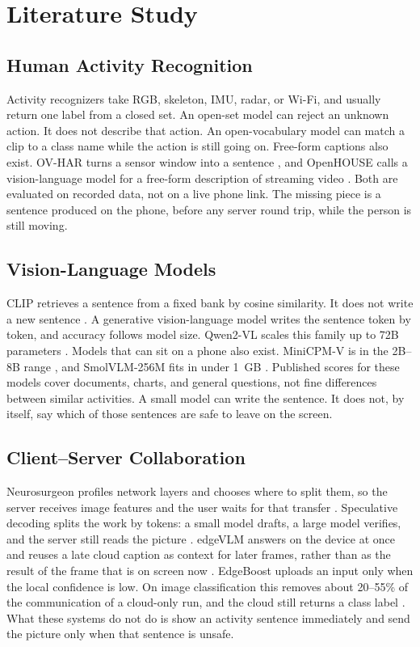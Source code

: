 \section{Literature Study}

\subsection{Human Activity Recognition}
Activity recognizers take RGB, skeleton, IMU, radar, or Wi-Fi, and usually
return one label from a closed set. An open-set model can reject an unknown
action. It does not describe that action. An open-vocabulary model can match
a clip to a class name while the action is still going on. Free-form
captions also exist. OV-HAR turns a sensor window into a sentence
\cite{ray2025ovhar}, and OpenHOUSE calls a vision-language model for a
free-form description of streaming video \cite{kang2025openhouse}. Both are
evaluated on recorded data, not on a live phone link. The missing piece is a
sentence produced on the phone, before any server round trip, while the
person is still moving.
\subsection{Vision-Language Models}
CLIP retrieves a sentence from a fixed bank by cosine similarity. It does
not write a new sentence \cite{radford2021learning}. A generative
vision-language model writes the sentence token by token, and accuracy
follows model size. Qwen2-VL scales this family up to 72B parameters
\cite{wang2024qwen2vl}. Models that can sit on a phone also exist.
MiniCPM-V is in the 2B--8B range \cite{yao2024minicpm}, and SmolVLM-256M
fits in under 1~GB \cite{marafioti2025smolvlm}. Published scores for these
models cover documents, charts, and general questions, not fine differences
between similar activities. A small model can write the sentence. It does
not, by itself, say which of those sentences are safe to leave on the
screen.
\subsection{Client--Server Collaboration}
Neurosurgeon profiles network layers and chooses where to split them, so
the server receives image features and the user waits for that transfer
\cite{kang2017neurosurgeon}. Speculative decoding splits the work by
tokens: a small model drafts, a large model verifies, and the server still
reads the picture \cite{leviathan2023fast}. edgeVLM answers on the device
at once and reuses a late cloud caption as context for later frames, rather
than as the result of the frame that is on screen now
\cite{qian2025edgevlm}. EdgeBoost uploads an input only when the local
confidence is low. On image classification this removes about 20--55\% of
the communication of a cloud-only run, and the cloud still returns a class
label \cite{said2024edgeboost}. What these systems do not do is show an
activity sentence immediately and send the picture only when that sentence
is unsafe.
